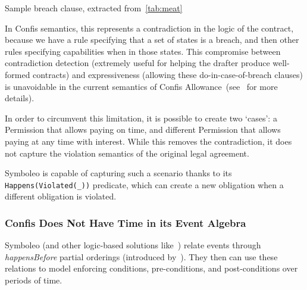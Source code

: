 \begin{table}[h]
    \centering
    \setlength{\fboxsep}{10pt}
    \caption[Sample breach clause]{Sample breach clause, extracted from~\autoref{tab:meat}}
    \label{tab:meat-breach}
\end{table}

In Confis semantics, this represents a contradiction in the logic of the contract, because we have a rule specifying that a set of states is a breach, and then other rules specifying capabilities when in those states.
This compromise between contradiction detection (extremely useful for helping the drafter produce well-formed contracts) and expressiveness (allowing these do-in-case-of-breach clauses) is unavoidable in the current semantics of Confis Allowance~(see~ for more details).

In order to circumvent this limitation, it is possible to create two `cases': a Permission that allows paying on time, and different Permission that allows paying at any time with interest.
While this removes the contradiction, it does not capture the violation semantics of the original legal agreement.

Symboleo is capable of capturing such a scenario thanks to its \texttt{Happens(Violated(\_))} predicate, which can create a new obligation when a different obligation is violated.

\subsubsection{Confis Does Not Have Time in its Event Algebra}
\label{subsubsec:limits-time}

Symboleo (and other logic-based solutions like~\cite{knottenbeltContractDriven}) relate events through \emph{happensBefore} partial orderings (introduced by~\cite{kowalski1989logicEventBased}).
They then can use these relations to model enforcing conditions, pre-conditions, and post-conditions over periods of time.

